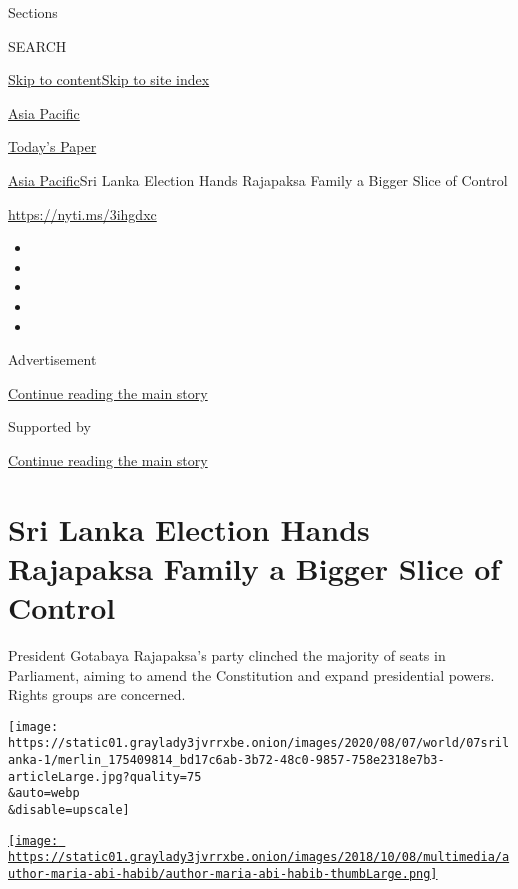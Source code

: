 Sections

SEARCH

\protect\hyperlink{site-content}{Skip to
content}\protect\hyperlink{site-index}{Skip to site index}

\href{https://www.nytimes3xbfgragh.onion/section/world/asia}{Asia
Pacific}

\href{https://myaccount.nytimes3xbfgragh.onion/auth/login?response_type=cookie\&client_id=vi}{}

\href{https://www.nytimes3xbfgragh.onion/section/todayspaper}{Today's
Paper}

\href{/section/world/asia}{Asia Pacific}\textbar{}Sri Lanka Election
Hands Rajapaksa Family a Bigger Slice of Control

\url{https://nyti.ms/3ihgdxc}

\begin{itemize}
\item
\item
\item
\item
\item
\end{itemize}

Advertisement

\protect\hyperlink{after-top}{Continue reading the main story}

Supported by

\protect\hyperlink{after-sponsor}{Continue reading the main story}

\hypertarget{sri-lanka-election-hands-rajapaksa-family-a-bigger-slice-of-control}{%
\section{Sri Lanka Election Hands Rajapaksa Family a Bigger Slice of
Control}\label{sri-lanka-election-hands-rajapaksa-family-a-bigger-slice-of-control}}

President Gotabaya Rajapaksa's party clinched the majority of seats in
Parliament, aiming to amend the Constitution and expand presidential
powers. Rights groups are concerned.

\texttt{[image: https://static01.graylady3jvrrxbe.onion/images/2020/08/07/world/07srilanka-1/merlin\_175409814\_bd17c6ab-3b72-48c0-9857-758e2318e7b3-articleLarge.jpg?quality=75\\\&auto=webp\\\&disable=upscale]}

\href{https://www.nytimes3xbfgragh.onion/by/maria-abi-habib}{\texttt{[image: https://static01.graylady3jvrrxbe.onion/images/2018/10/08/multimedia/author-maria-abi-habib/author-maria-abi-habib-thumbLarge.png]}}

